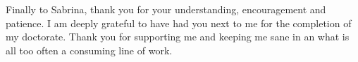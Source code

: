 \begin{acknowledgements}
  Finally to Sabrina, thank you for your understanding, encouragement and
  patience. I am deeply grateful to have had you next to me for the completion
  of my doctorate. Thank you for supporting me and keeping me sane in an what is
  all too often a consuming line of work.
\end{acknowledgements}
